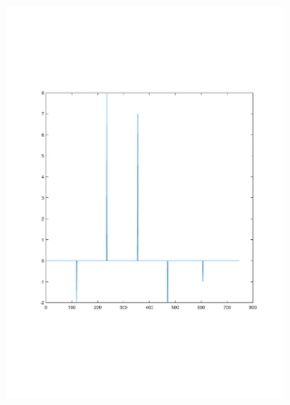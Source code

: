 \documentclass[sigconf]{acmart}
\begin{document}
\begin{figure}[!htp]
\begin{subfigure}[t]{0.4\linewidth}
		\includegraphics[width=0.95\linewidth, trim={100 100 0 0}, clip=true]{fig/route_change_21}
		\label{fig:3.2c}
	\end{subfigure}
	\begin{subfigure}[t]{0.4\linewidth}
		\centering

\end{subfigure}
\end{figure}
\end{document}

